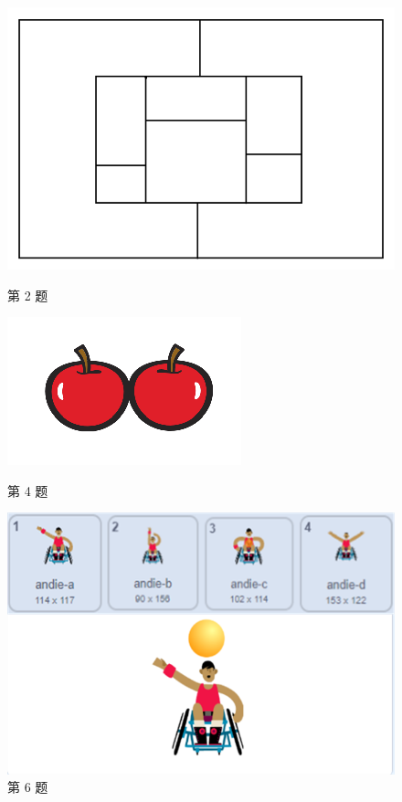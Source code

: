 \documentclass[10pt, a4paper]{article}
\begin{document}
\begin{enumerate}
        \begin{figure}[htbp]
            \begin{minipage}[t]{.33\textwidth}
                \centering
                \includegraphics[width=.5\textwidth]{2.png}
                \caption*{第 2 题}
            \end{minipage}
            \begin{minipage}[t]{.33\textwidth}
                \centering
                \includegraphics[width=.5\textwidth]{4.png}
                \caption*{第 4 题}
            \end{minipage}
            \begin{minipage}[t]{.33\textwidth}
                \centering
                \includegraphics[width=.8\textwidth]{6.png}
                \caption*{第 6 题}
            \end{minipage}
        \end{figure}


\end{enumerate}
\end{document}
